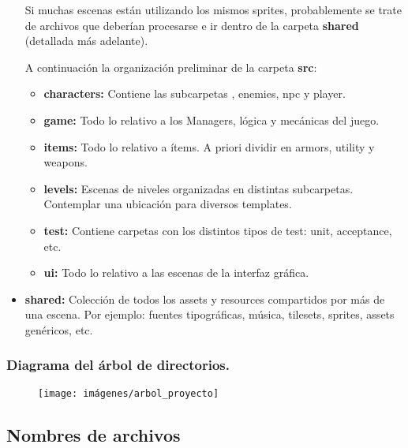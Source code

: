 \begin{itemize}
Si muchas escenas están utilizando los mismos sprites, probablemente se trate de archivos que deberían procesarse e ir dentro de la carpeta \textbf{shared} (detallada más adelante).

A continuación la organización preliminar de la carpeta \textbf{src}:

\begin{itemize}
	\item \textbf{characters:} Contiene las subcarpetas , enemies, npc y player.

	\item \textbf{game:} Todo lo relativo a los Managers, lógica y mecánicas del juego.

	\item \textbf{items:} Todo lo relativo a ítems. A priori dividir en armors, utility y weapons.

	\item \textbf{levels:} Escenas de niveles organizadas en distintas subcarpetas. Contemplar una ubicación para diversos templates.
	
	\item \textbf{test:} Contiene carpetas con los distintos tipos de test: unit, acceptance, etc.

	\item \textbf{ui:} Todo lo relativo a las escenas de la interfaz gráfica.
\end{itemize}

\item \textbf{shared:} Colección de todos los assets y resources compartidos por más de una escena. Por ejemplo: fuentes tipográficas, música, tilesets, sprites, assets genéricos, etc.
\end{itemize}

\subsubsection*{Diagrama del árbol de directorios.}
\begin{figure}[H]
\centering
\texttt{[image: imágenes/arbol\_proyecto]}
\label{fig:arbolproyecto}
\end{figure}


\subsection{Nombres de archivos}\label{organizacion:nombres-de-archivos}

